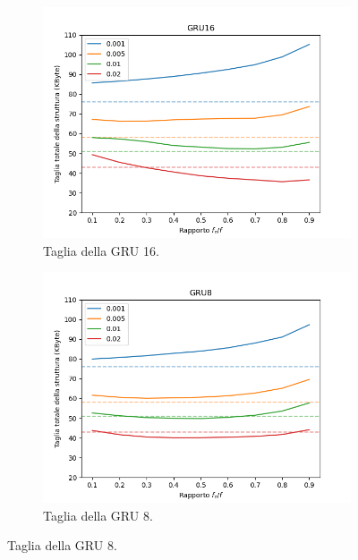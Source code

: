 \documentclass[../../main.tex]{subfiles}
\begin{document}
    \begin{figure}[H]
        \centering
        \begin{subfigure}[b]{0.32\textwidth}
            \centering
            \includegraphics[width = \textwidth]{immagini/7/LBF/GRU16_Taglia.png}
            \caption{Taglia della GRU 16.}
            \label{fig:LBFTagliaGRU16}
        \end{subfigure}
        \begin{subfigure}[b]{0.32\textwidth}
            \centering
            \includegraphics[width = \textwidth]{immagini/7/LBF/GRU8_Taglia.png}
            \caption{Taglia della GRU 8.}
            \label{fig:LBFTagliaGRU8}
        \end{subfigure}

\end{figure}
\end{document}
